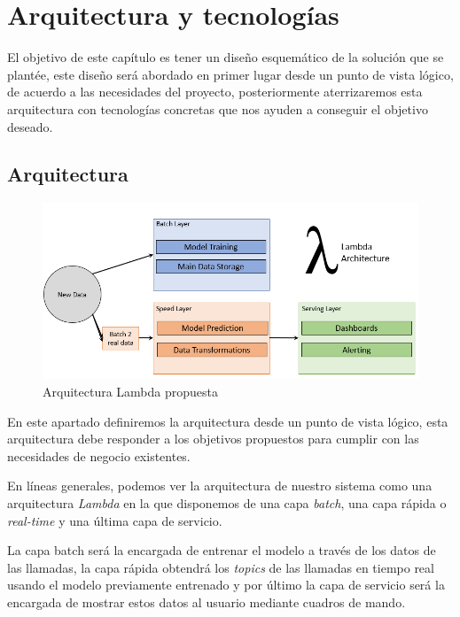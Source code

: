 \chapter{Arquitectura y tecnologías}
\label{chapter:arquitectura}

El objetivo de este capítulo es tener un diseño esquemático de la solución que se plantée, este diseño será abordado en primer lugar desde un punto de vista lógico, de acuerdo a las necesidades del proyecto, posteriormente aterrizaremos esta arquitectura con tecnologías concretas que nos ayuden a conseguir el objetivo deseado.

\section{Arquitectura}
\begin{figure}[!ht]
	\centering
	\includegraphics[width=1\textwidth]{images/arqu/lambda}
	\caption{Arquitectura Lambda propuesta}
	\label{fig:lambda}
\end{figure}




En este apartado definiremos la arquitectura desde un punto de vista lógico, esta arquitectura debe responder a los objetivos propuestos para cumplir con las necesidades de negocio existentes. 


En líneas generales, podemos ver la arquitectura de nuestro sistema como una arquitectura \textit{Lambda} en la que disponemos de una capa \textit{batch}, una capa rápida o \textit{real-time} y una última capa de servicio.



La capa batch será la encargada de entrenar el modelo a través de los datos de las llamadas, la capa rápida obtendrá los \textit{topics} de las llamadas en tiempo real usando el modelo previamente entrenado y por último la capa de servicio será la encargada de mostrar estos datos al usuario mediante cuadros de mando.  

